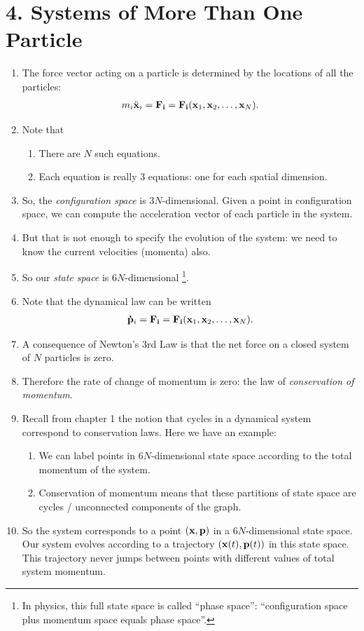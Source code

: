 \section{4.    Systems of  More Than One Particle}
\begin{enumerate}
\item The force vector acting on a particle is determined by the locations of all the particles:
  \begin{align*}
    m_i\ddot{\mathbf x}_i = \mathbf{F_i} = \mathbf{F_i}(\mathbf x_1, \mathbf x_2, \ldots, \mathbf x_N).
  \end{align*}
\item Note that
  \begin{enumerate}
  \item There are $N$ such equations.
  \item Each equation is really 3 equations: one for each spatial dimension.
  \end{enumerate}
\item So, the {\it configuration space} is $3N$-dimensional. Given a point in configuration space, we can compute the acceleration
  vector of each particle in the system.
\item But that is not enough to specify the evolution of the system: we need to know the current velocities (momenta)
  also.
\item So our {\it state space} is $6N$-dimensional \footnote{In physics, this full state space is called ``phase space'': ``configuration space plus momentum space
    equals phase space''.}.
\item Note that the dynamical law can be written
  \begin{align*}
    \mathbf{\dot{p}}_i = \mathbf{F_i} = \mathbf{F_i}(\mathbf x_1, \mathbf x_2, \ldots, \mathbf x_N).
  \end{align*}
\item A consequence of Newton's 3rd Law is that the net force on a closed system of  $N$ particles is zero.
\item Therefore the rate of change of momentum is zero: the law of \emph{conservation of momentum}.
\item Recall from chapter 1 the notion that cycles in a dynamical system correspond to conservation laws. Here we have
  an example:
  \begin{enumerate}
  \item We can label points in $6N$-dimensional state space according to the total momentum of the system.
  \item Conservation of momentum means that these partitions of state space are cycles / unconnected components of the
    graph.
  \end{enumerate}
\item So the system corresponds to a point $(\mathbf x, \mathbf{p})$ in a $6N$-dimensional state space. Our system evolves according
  to a trajectory $(\mathbf x(t), \mathbf{p}(t))$ in this state space. This trajectory never jumps between points
  with different values of total system momentum.

\end{enumerate}

